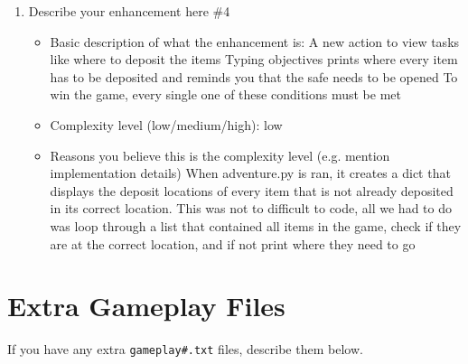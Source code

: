 \documentclass[11pt]{article}
\begin{document}
\begin{enumerate}
\item Describe your enhancement here \#4
	\begin{itemize}
	\item Basic description of what the enhancement is:
	A new action to view tasks like where to deposit the items
	Typing objectives prints where every item has to be deposited and reminds you that the safe needs to be opened
	To win the game, every single one of these conditions must be met
	\item Complexity level (low/medium/high): low
	\item Reasons you believe this is the complexity level (e.g. mention implementation details)
    When adventure.py is ran, it creates a dict that displays the deposit locations of every item
    that is not already deposited in its correct location.
    This was not to difficult to code, all we had to do was loop through a list that contained all items in the game,
    check if they are at the correct location, and if not print where they need to go
	\end{itemize}
 

\end{enumerate}


\section*{Extra Gameplay Files}

If you have any extra \texttt{gameplay\#.txt} files, describe them below.
\end{document}

